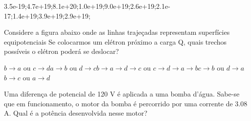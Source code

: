 \documentclass[12pt, addpoints]{exam}
\begin{document}
\begin{questions}
\begin{multicols*}{2}
\begin{oneparchoices}
\choice 3.5e-19;\choice 4.7e+19;\choice 8.1e+20;\choice 1.0e+19;\choice 9.0e+19;\choice 2.6e+19;\choice 2.1e-17;\choice 1.4e+19;\choice 3.9e+19;\choice 2.9e+19;\end{oneparchoices}
\question[20] Considere a figura abaixo onde as linhas trajeçadas representam superfícies equipotenciais Se colocarmos um elétron próximo a carga Q, quais trechos possíveis o elétron poderá se deslocar?
        
        \begin{center}
            \begin{minipage}[c]{0.5\linewidth}
            \end{minipage}
        \end{center}
        
        

\begin{choices}
\choice $b\rightarrow a$ ou $c\rightarrow d$\choice $a\rightarrow b$ ou $d\rightarrow c$\choice $b\rightarrow a\rightarrow d\rightarrow c$ ou $c\rightarrow d\rightarrow a\rightarrow b$\choice $c\rightarrow b$ ou $d\rightarrow a$\choice $b\rightarrow c$ ou $a\rightarrow d$\end{choices}
\question[20] Uma diferença de potencial de 120 V é aplicada a uma bomba d’água. Sabe-se que em funcionamento, o motor da bomba é percorrido por uma corrente de    3.08 A. Qual é a potência desenvolvida nesse motor?


\end{multicols*}
\end{questions}
\end{document}
